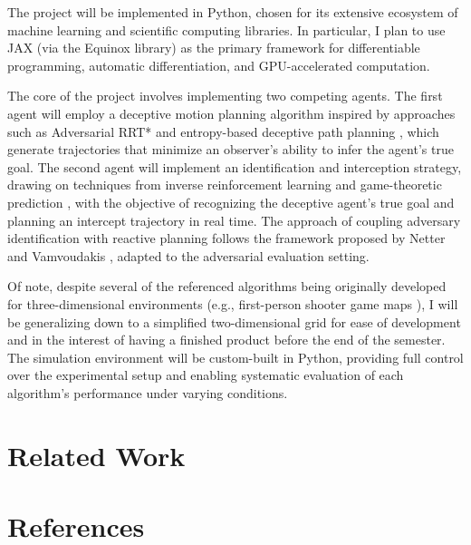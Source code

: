 \documentclass[letterpaper, 10pt, conference]{ieeeconf}
\begin{document}
The project will be implemented in Python, chosen for its extensive ecosystem of machine learning and scientific computing libraries. In particular, I plan to use JAX (via the Equinox library) as the primary framework for differentiable programming, automatic differentiation, and GPU-accelerated computation.

The core of the project involves implementing two competing agents. The first agent will employ a deceptive motion planning algorithm inspired by approaches such as Adversarial RRT* \cite{nichols2022adversarial} and entropy-based deceptive path planning \cite{xu2020single, xu2019goal}, which generate trajectories that minimize an observer's ability to infer the agent's true goal. The second agent will implement an identification and interception strategy, drawing on techniques from inverse reinforcement learning and game-theoretic prediction \cite{zeng2023recognition, tastan2012learning, lecleach2021lucidgames}, with the objective of recognizing the deceptive agent's true goal and planning an intercept trajectory in real time. The approach of coupling adversary identification with reactive planning follows the framework proposed by Netter and Vamvoudakis \cite{netter2024motion}, adapted to the adversarial evaluation setting.

Of note, despite several of the referenced algorithms being originally developed for three-dimensional environments (e.g., first-person shooter game maps \cite{tastan2012learning}), I will be generalizing down to a simplified two-dimensional grid for ease of development and in the interest of having a finished product before the end of the semester. The simulation environment will be custom-built in Python, providing full control over the experimental setup and enabling systematic evaluation of each algorithm's performance under varying conditions.

\section{Related Work} \label{sec:related-work}

\section*{References} \label{sec:references}
\printbibliography[heading = none]
\end{document}

